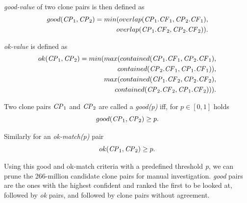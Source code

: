 \documentclass[sigconf,review, anonymous]{acmart}
\newcommand{\squeezeup}{\vspace{-0.5mm}}
\begin{document}
\noindent\textit{good-value} of two clone pairs is then defined as
\begin{align*}
	good(\textrm{\textit{CP}}_1, \textrm{\textit{CP}}_2) = min(overlap(\textrm{\textit{CP}}_1.\textrm{\textit{CF}}_1,\textrm{\textit{CP}}_2.\textrm{\textit{CF}}_1), \\ overlap(\textrm{\textit{CP}}_1.\textrm{\textit{CF}}_2,\textrm{\textit{CP}}_2.\textrm{\textit{CF}}_2)).
\end{align*}

\noindent\textit{ok-value} is defined as
\begin{align*}
	ok(\textrm{\textit{CP}}_1,\textrm{\textit{CP}}_2) = min(max(contained(\textrm{\textit{CP}}_1.\textrm{\textit{CF}}_1,\textrm{\textit{CP}}_2.\textrm{\textit{CF}}_1), \\ contained(\textrm{\textit{CP}}_2.\textrm{\textit{CF}}_1,\textrm{\textit{CP}}_1.\textrm{\textit{CF}}_1)),
	\\ max(contained(\textrm{\textit{CP}}_1.\textrm{\textit{CF}}_2,\textrm{\textit{CP}}_2.\textrm{\textit{CF}}_2), \\contained(\textrm{\textit{CP}}_2.\textrm{\textit{CF}}_2,\textrm{\textit{CP}}_1.\textrm{\textit{CF}}_2))).
\end{align*}

Two clone pairs $\textrm{\textit{CP}}_1$ and $\textrm{\textit{CP}}_2$ are called a \textit{\textit{good}(p)} iff, for $p \in [0,1]$ holds 
\begin{equation}
good(\textrm{\textit{CP}}_1,\textrm{\textit{CP}}_2) \geq p.
\end{equation}

Similarly for an \textit{ok-match(p)} pair
\begin{equation}
ok(\textrm{\textit{CP}}_1,\textrm{\textit{CP}}_2) \geq p.
\end{equation}

Using this good and ok-match criteria with a predefined threshold \textit{p}, we can prune the 266-million candidate clone pairs for manual investigation. \textit{good} pairs are the ones with the highest confident and ranked the first to be looked at, followed by \textit{ok} pairs, and followed by clone pairs without agreement.
\end{document}
